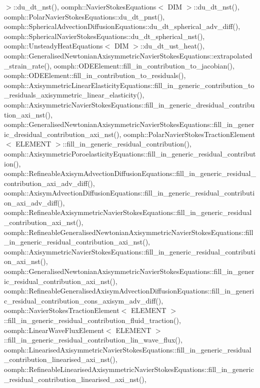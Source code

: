 $>$\+::du\+\_\+dt\+\_\+nst(), oomph\+::\+Navier\+Stokes\+Equations$<$ D\+I\+M $>$\+::du\+\_\+dt\+\_\+nst(), oomph\+::\+Polar\+Navier\+Stokes\+Equations\+::du\+\_\+dt\+\_\+pnst(), oomph\+::\+Spherical\+Advection\+Diffusion\+Equations\+::du\+\_\+dt\+\_\+spherical\+\_\+adv\+\_\+diff(), oomph\+::\+Spherical\+Navier\+Stokes\+Equations\+::du\+\_\+dt\+\_\+spherical\+\_\+nst(), oomph\+::\+Unsteady\+Heat\+Equations$<$ D\+I\+M $>$\+::du\+\_\+dt\+\_\+ust\+\_\+heat(), oomph\+::\+Generalised\+Newtonian\+Axisymmetric\+Navier\+Stokes\+Equations\+::extrapolated\+\_\+strain\+\_\+rate(), oomph\+::\+O\+D\+E\+Element\+::fill\+\_\+in\+\_\+contribution\+\_\+to\+\_\+jacobian(), oomph\+::\+O\+D\+E\+Element\+::fill\+\_\+in\+\_\+contribution\+\_\+to\+\_\+residuals(), oomph\+::\+Axisymmetric\+Linear\+Elasticity\+Equations\+::fill\+\_\+in\+\_\+generic\+\_\+contribution\+\_\+to\+\_\+residuals\+\_\+axisymmetric\+\_\+linear\+\_\+elasticity(), oomph\+::\+Axisymmetric\+Navier\+Stokes\+Equations\+::fill\+\_\+in\+\_\+generic\+\_\+dresidual\+\_\+contribution\+\_\+axi\+\_\+nst(), oomph\+::\+Generalised\+Newtonian\+Axisymmetric\+Navier\+Stokes\+Equations\+::fill\+\_\+in\+\_\+generic\+\_\+dresidual\+\_\+contribution\+\_\+axi\+\_\+nst(), oomph\+::\+Polar\+Navier\+Stokes\+Traction\+Element$<$ E\+L\+E\+M\+E\+N\+T $>$\+::fill\+\_\+in\+\_\+generic\+\_\+residual\+\_\+contribution(), oomph\+::\+Axisymmetric\+Poroelasticity\+Equations\+::fill\+\_\+in\+\_\+generic\+\_\+residual\+\_\+contribution(), oomph\+::\+Refineable\+Axisym\+Advection\+Diffusion\+Equations\+::fill\+\_\+in\+\_\+generic\+\_\+residual\+\_\+contribution\+\_\+axi\+\_\+adv\+\_\+diff(), oomph\+::\+Axisym\+Advection\+Diffusion\+Equations\+::fill\+\_\+in\+\_\+generic\+\_\+residual\+\_\+contribution\+\_\+axi\+\_\+adv\+\_\+diff(), oomph\+::\+Refineable\+Axisymmetric\+Navier\+Stokes\+Equations\+::fill\+\_\+in\+\_\+generic\+\_\+residual\+\_\+contribution\+\_\+axi\+\_\+nst(), oomph\+::\+Refineable\+Generalised\+Newtonian\+Axisymmetric\+Navier\+Stokes\+Equations\+::fill\+\_\+in\+\_\+generic\+\_\+residual\+\_\+contribution\+\_\+axi\+\_\+nst(), oomph\+::\+Axisymmetric\+Navier\+Stokes\+Equations\+::fill\+\_\+in\+\_\+generic\+\_\+residual\+\_\+contribution\+\_\+axi\+\_\+nst(), oomph\+::\+Generalised\+Newtonian\+Axisymmetric\+Navier\+Stokes\+Equations\+::fill\+\_\+in\+\_\+generic\+\_\+residual\+\_\+contribution\+\_\+axi\+\_\+nst(), oomph\+::\+Refineable\+Generalised\+Axisym\+Advection\+Diffusion\+Equations\+::fill\+\_\+in\+\_\+generic\+\_\+residual\+\_\+contribution\+\_\+cons\+\_\+axisym\+\_\+adv\+\_\+diff(), oomph\+::\+Navier\+Stokes\+Traction\+Element$<$ E\+L\+E\+M\+E\+N\+T $>$\+::fill\+\_\+in\+\_\+generic\+\_\+residual\+\_\+contribution\+\_\+fluid\+\_\+traction(), oomph\+::\+Linear\+Wave\+Flux\+Element$<$ E\+L\+E\+M\+E\+N\+T $>$\+::fill\+\_\+in\+\_\+generic\+\_\+residual\+\_\+contribution\+\_\+lin\+\_\+wave\+\_\+flux(), oomph\+::\+Linearised\+Axisymmetric\+Navier\+Stokes\+Equations\+::fill\+\_\+in\+\_\+generic\+\_\+residual\+\_\+contribution\+\_\+linearised\+\_\+axi\+\_\+nst(), oomph\+::\+Refineable\+Linearised\+Axisymmetric\+Navier\+Stokes\+Equations\+::fill\+\_\+in\+\_\+generic\+\_\+residual\+\_\+contribution\+\_\+linearised\+\_\+axi\+\_\+nst(), 